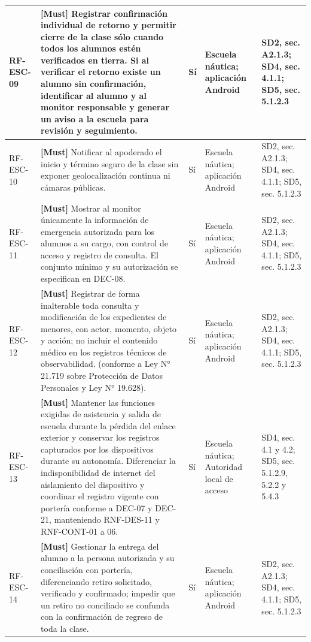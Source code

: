 \begin{paginaHorizontalSynaptix}
\begin{longtable}{|L{0.09\AnchoMatrizTDoce}|L{0.385\AnchoMatrizTDoce}|L{0.065\AnchoMatrizTDoce}|L{0.18\AnchoMatrizTDoce}|L{0.28\AnchoMatrizTDoce}|}
RF-\allowbreak{}ESC-\allowbreak{}09 &
\textbf{[Must]} Registrar confirmación individual de retorno y permitir cierre de la clase sólo cuando todos los alumnos estén verificados en tierra. Si al verificar el retorno existe un alumno sin confirmación, identificar al alumno y al monitor responsable y generar un aviso a la escuela para revisión y seguimiento. &
Sí &
Escuela náutica; aplicación Android &
SD2, sec. A2.1.3; SD4, sec. 4.1.1; SD5, sec. 5.1.2.3 \\ \hline

RF-\allowbreak{}ESC-\allowbreak{}10 &
\textbf{[Must]} Notificar al apoderado el inicio y término seguro de la clase sin exponer geolocalización continua ni cámaras públicas. &
Sí &
Escuela náutica; aplicación Android &
SD2, sec. A2.1.3; SD4, sec. 4.1.1; SD5, sec. 5.1.2.3 \\ \hline

RF-\allowbreak{}ESC-\allowbreak{}11 &
\textbf{[Must]} Mostrar al monitor únicamente la información de emergencia autorizada para los alumnos a su cargo, con control de acceso y registro de consulta. El conjunto mínimo y su autorización se especifican en DEC-08. &
Sí &
Escuela náutica; aplicación Android &
SD2, sec. A2.1.3; SD4, sec. 4.1.1; SD5, sec. 5.1.2.3 \\ \hline

RF-\allowbreak{}ESC-\allowbreak{}12 &
\textbf{[Must]} Registrar de forma inalterable toda consulta y modificación de los expedientes de menores, con actor, momento, objeto y acción; no incluir el contenido médico en los registros técnicos de observabilidad. (conforme a Ley N° 21.719 sobre Protección de Datos Personales y Ley N° 19.628). &
Sí &
Escuela náutica; aplicación Android &
SD2, sec. A2.1.3; SD4, sec. 4.1.1; SD5, sec. 5.1.2.3 \\ \hline

RF-\allowbreak{}ESC-\allowbreak{}13 &
\textbf{[Must]} Mantener las funciones exigidas de asistencia y salida de escuela durante la pérdida del enlace exterior y conservar los registros capturados por los dispositivos durante su autonomía. Diferenciar la indisponibilidad de internet del aislamiento del dispositivo y coordinar el registro vigente con portería conforme a DEC-07 y DEC-21, manteniendo RNF-DES-11 y RNF-CONT-01 a 06. &
Sí &
Escuela náutica; Autoridad local de acceso &
SD4, sec. 4.1 y 4.2; SD5, sec. 5.1.2.9, 5.2.2 y 5.4.3 \\ \hline

RF-\allowbreak{}ESC-\allowbreak{}14 &
\textbf{[Must]} Gestionar la entrega del alumno a la persona autorizada y su conciliación con portería, diferenciando retiro solicitado, verificado y confirmado; impedir que un retiro no conciliado se confunda con la confirmación de regreso de toda la clase. &
Sí &
Escuela náutica; aplicación Android &
SD2, sec. A2.1.3; SD4, sec. 4.1.1; SD5, sec. 5.1.2.3 \\ \hline
\end{longtable}



\end{paginaHorizontalSynaptix}
